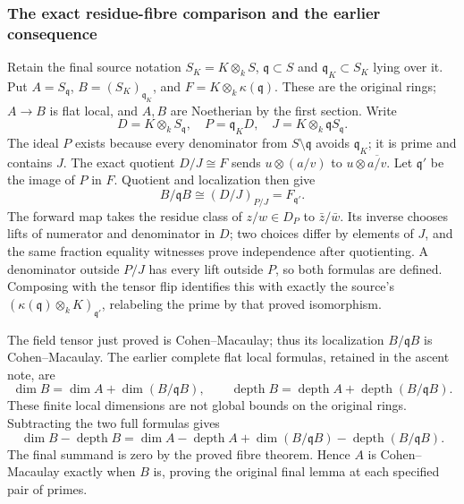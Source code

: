 \subsubsection{The exact residue-fibre comparison and the earlier consequence}\label{algebra-proof-071-the-exact-residue-fibre-comparison-and-the-earlier-consequence}

Retain the final source notation \(S_K=K\otimes_kS\), \(\mathfrak q\subset S\) and \(\mathfrak q_K\subset S_K\) lying over it. Put \(A=S_{\mathfrak q}\), \(B=(S_K)_{\mathfrak q_K}\), and \(F=K\otimes_k\kappa(\mathfrak q)\). These are the original rings; \(A\to B\) is flat local, and \(A,B\) are Noetherian by the first section. Write \[
 D=K\otimes_kS_{\mathfrak q},\quad
 P=\mathfrak q_KD,\quad
 J=K\otimes_k\mathfrak q S_{\mathfrak q}.
\] The ideal \(P\) exists because every denominator from \(S\setminus\mathfrak q\) avoids \(\mathfrak q_K\); it is prime and contains \(J\). The exact quotient \(D/J\cong F\) sends \(u\otimes(a/v)\) to \(u\otimes\overline{a/v}\). Let \(\mathfrak q'\) be the image of \(P\) in \(F\). Quotient and localization then give \[
 B/\mathfrak q B\cong(D/J)_{P/J}=F_{\mathfrak q'}.
\] The forward map takes the residue class of \(z/w\in D_P\) to \(\bar z/\bar w\). Its inverse chooses lifts of numerator and denominator in \(D\); two choices differ by elements of \(J\), and the same fraction equality witnesses prove independence after quotienting. A denominator outside \(P/J\) has every lift outside \(P\), so both formulas are defined. Composing with the tensor flip identifies this with exactly the source's \((\kappa(\mathfrak q)\otimes_kK)_{\mathfrak q'}\), relabeling the prime by that proved isomorphism.

The field tensor just proved is Cohen--Macaulay; thus its localization \(B/\mathfrak q B\) is Cohen--Macaulay. The earlier complete flat local formulas, retained in the ascent note, are \[
 \dim B=\dim A+\dim(B/\mathfrak qB),\qquad
 \operatorname{depth}B=\operatorname{depth}A+
                      \operatorname{depth}(B/\mathfrak qB).
\] These finite local dimensions are not global bounds on the original rings. Subtracting the two full formulas gives \[
 \dim B-\operatorname{depth}B=
 \dim A-\operatorname{depth}A+
 \dim(B/\mathfrak qB)-\operatorname{depth}(B/\mathfrak qB).
\] The final summand is zero by the proved fibre theorem. Hence \(A\) is Cohen--Macaulay exactly when \(B\) is, proving the original final lemma at each specified pair of primes.

